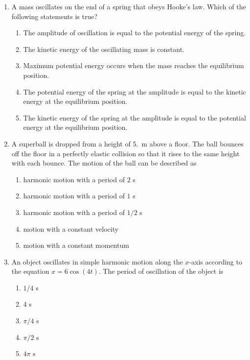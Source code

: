 \documentclass{../../../oss-apphys}
\begin{document}
\genheader


\genmultidirections

\gengravity

\raggedcolumns
\begin{multicols}{2}
  \begin{enumerate}[leftmargin=18pt]

  \item A mass oscillates on the end of a spring that obeys Hooke's law. Which
    of the following statements is true?
    \begin{enumerate}[noitemsep,topsep=0pt,leftmargin=18pt,label=(\Alph*)]
    \item The amplitude of oscillation is equal to the potential energy of the
      spring.
    \item The kinetic energy of the oscillating mass is constant.
    \item Maximum potential energy occurs when the mass reaches the
      equilibrium position.
    \item The potential energy of the spring at the amplitude is equal to the
      kinetic energy at the equilibrium position.
    \item The kinetic energy of the spring at the amplitude is equal to the
      potential energy at the equilibrium position.
    \end{enumerate}

  \item A superball is dropped from a height of \SI{5.}{\metre} above a floor.
    The ball bounces off the floor in a perfectly elastic collision so that it
    rises to the same height with each bounce. The motion of the ball can be
    described as
    \begin{enumerate}[noitemsep,topsep=0pt,leftmargin=18pt,label=(\Alph*)]
    \item harmonic motion with a period of $2$ \si{\second}
    \item harmonic motion with a period of $1$ \si{\second}
    \item harmonic motion with a period of $1/2$ \si{\second}
    \item motion with a constant velocity
    \item motion with a constant momentum
    \end{enumerate}

  \item An object oscillates in simple harmonic motion along the $x$-axis
    according to the equation $x = 6 \cos(4t)$. The period of oscillation of the
    object is
    \begin{enumerate}[noitemsep,topsep=0pt,leftmargin=18pt,label=(\Alph*)]
    \item $1/4$ s
    \item 4 s
    \item$\pi/4$ s
    \item$\pi/2$ s
    \item$4\pi$ s
    \end{enumerate}
    \columnbreak
    

\end{enumerate}
\end{multicols}
\end{document}
